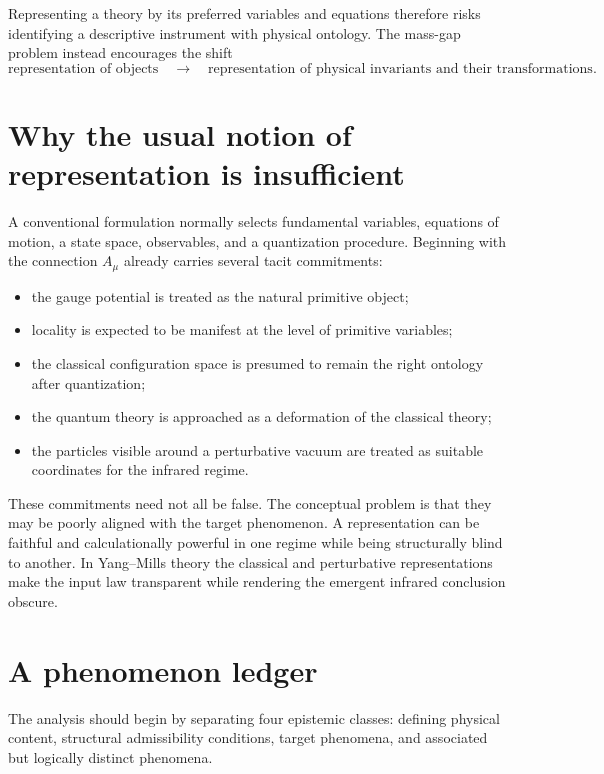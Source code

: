 \documentclass[11pt]{article}
\begin{document}
Representing a theory by its preferred variables and equations therefore risks
identifying a descriptive instrument with physical ontology.  The mass-gap
problem instead encourages the shift
\begin{equation}
  \text{representation of objects}
  \quad\longrightarrow\quad
  \text{representation of physical invariants and their transformations}.
  \label{eq:shift}
\end{equation}

\section{Why the usual notion of representation is insufficient}

A conventional formulation normally selects fundamental variables, equations
of motion, a state space, observables, and a quantization procedure.  Beginning
with the connection $A_\mu$ already carries several tacit commitments:
\begin{itemize}[leftmargin=2em]
  \item the gauge potential is treated as the natural primitive object;
  \item locality is expected to be manifest at the level of primitive
        variables;
  \item the classical configuration space is presumed to remain the right
        ontology after quantization;
  \item the quantum theory is approached as a deformation of the classical
        theory;
  \item the particles visible around a perturbative vacuum are treated as
        suitable coordinates for the infrared regime.
\end{itemize}

These commitments need not all be false.  The conceptual problem is that they
may be poorly aligned with the target phenomenon.  A representation can be
faithful and calculationally powerful in one regime while being structurally
blind to another.  In Yang--Mills theory the classical and perturbative
representations make the input law transparent while rendering the emergent
infrared conclusion obscure.

\section{A phenomenon ledger}

The analysis should begin by separating four epistemic classes: defining
physical content, structural admissibility conditions, target phenomena, and
associated but logically distinct phenomena.
\end{document}
